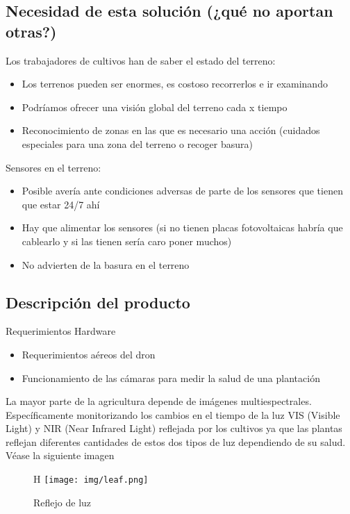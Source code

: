 \documentclass[11pt,spanish]{article} %
\begin{document}
\subsection{Necesidad de esta solución (¿qué no aportan otras?)}
Los trabajadores de cultivos han de saber el estado del terreno:
\begin{itemize}
	\item Los terrenos pueden ser enormes, es costoso recorrerlos e ir examinando 
	\item Podríamos ofrecer una visión global del terreno cada x tiempo
	\item Reconocimiento de zonas en las que es necesario una acción (cuidados especiales para una zona del terreno o recoger basura)
\end{itemize}

Sensores en el terreno:
\begin{itemize}
	\item Posible avería ante condiciones adversas de parte de los sensores que tienen que estar 24/7 ahí %
	\item Hay que alimentar los sensores (si no tienen placas fotovoltaicas habría que cablearlo y si las tienen sería caro poner muchos)
	\item No advierten de la basura en el terreno
\end{itemize}


\subsection{Descripción del producto}
Requerimientos Hardware %

\begin{itemize}
	\item Requerimientos aéreos del dron
	\item Funcionamiento de las cámaras para medir la salud de una plantación
\end{itemize}

La mayor parte de la agricultura depende de imágenes multiespectrales. Específicamente monitorizando los cambios en el tiempo de la luz VIS (Visible Light) y NIR (Near Infrared Light) reflejada por los cultivos ya que las plantas reflejan diferentes cantidades de estos dos tipos de luz dependiendo de su salud. Véase la siguiente imagen  %


\begin{figure}{H}
	\centering
	\texttt{[image: img/leaf.png]}
	\caption{Reflejo de luz}
	\label{fig:luz}
\end{figure}
\end{document}
